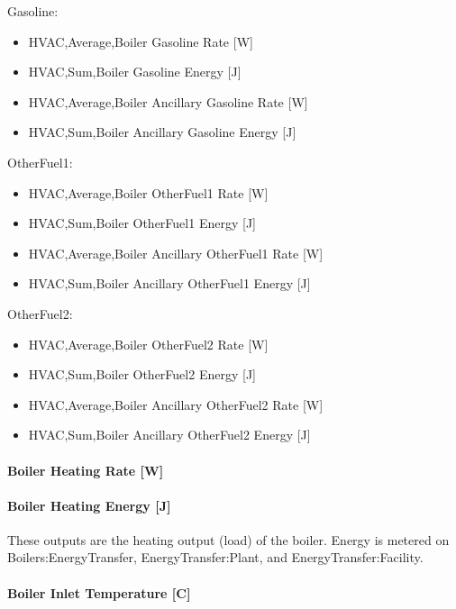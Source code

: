 Gasoline:

\begin{itemize}
    \item
    HVAC,Average,Boiler Gasoline Rate {[}W{]}
    \item
    HVAC,Sum,Boiler Gasoline Energy {[}J{]}
    \item
    HVAC,Average,Boiler Ancillary Gasoline Rate {[}W{]}
    \item
    HVAC,Sum,Boiler Ancillary Gasoline Energy {[}J{]}
\end{itemize}

OtherFuel1:

\begin{itemize}
    \item
    HVAC,Average,Boiler OtherFuel1 Rate {[}W{]}
    \item
    HVAC,Sum,Boiler OtherFuel1 Energy {[}J{]}
    \item
    HVAC,Average,Boiler Ancillary OtherFuel1 Rate {[}W{]}
    \item
    HVAC,Sum,Boiler Ancillary OtherFuel1 Energy {[}J{]}
\end{itemize}

OtherFuel2:

\begin{itemize}
    \item
    HVAC,Average,Boiler OtherFuel2 Rate {[}W{]}
    \item
    HVAC,Sum,Boiler OtherFuel2 Energy {[}J{]}
    \item
    HVAC,Average,Boiler Ancillary OtherFuel2 Rate {[}W{]}
    \item
    HVAC,Sum,Boiler Ancillary OtherFuel2 Energy {[}J{]}
\end{itemize}

\paragraph{Boiler Heating Rate {[}W{]}}\label{boiler-heating-rate-w}

\paragraph{Boiler Heating Energy {[}J{]}}\label{boiler-heating-energy-j}

These outputs are the heating output (load) of the boiler. Energy is metered on Boilers:EnergyTransfer, EnergyTransfer:Plant, and EnergyTransfer:Facility.

\paragraph{Boiler Inlet Temperature {[}C{]}}\label{boiler-inlet-temperature-c}

